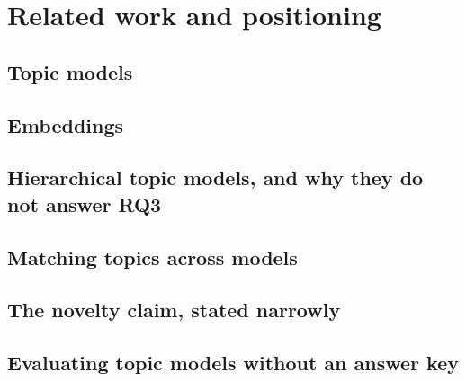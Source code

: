 \section{Related work and positioning}
\label{sec:related}

\subsection{Topic models}

\subsection{Embeddings}

\subsection{Hierarchical topic models, and why they do not answer RQ3}

\subsection{Matching topics across models}

\subsection{The novelty claim, stated narrowly}

\subsection{Evaluating topic models without an answer key}

